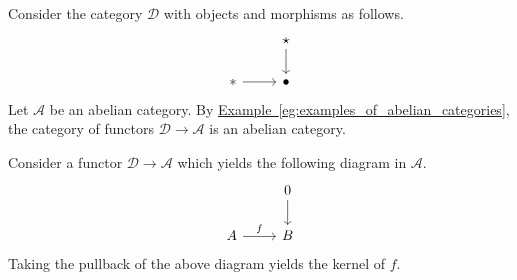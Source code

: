 \documentclass[main.tex]{subfiles}
\begin{document}
\begin{example}
  \label{eg:kernels_and_cokernels_are_functorial}
  Consider the category $\mathcal{D}$ with objects and morphisms as follows.
  \begin{equation*}
    \begin{tikzcd}
      & \star
      \arrow[d]
      \\
      *
      \arrow[r]
      & \bullet
    \end{tikzcd}
  \end{equation*}
  Let $\mathcal{A}$ be an abelian category. By \hyperref[eg:examples_of_abelian_categories]{Example~\ref*{eg:examples_of_abelian_categories}}, the category of functors $\mathcal{D} \to \mathcal{A}$ is an abelian category.

  Consider a functor $\mathcal{D} \to \mathcal{A}$ which yields the following diagram in $\mathcal{A}$.
  \begin{equation*}
    \begin{tikzcd}
      & 0
      \arrow[d]
      \\
      A
      \arrow[r, "f"]
      & B
    \end{tikzcd}
  \end{equation*}
  Taking the pullback of the above diagram yields the kernel of $f$.


\end{example}
\end{document}
